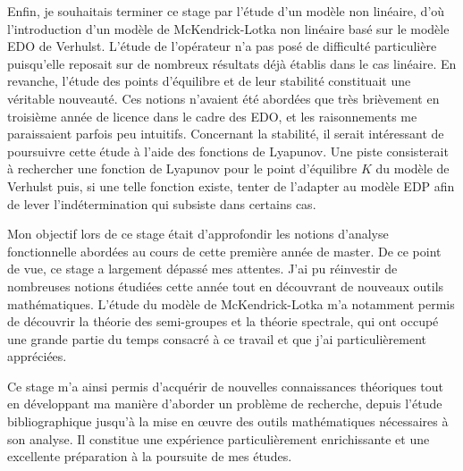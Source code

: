 Enfin, je souhaitais terminer ce stage par l'étude d'un modèle non linéaire, d'où l'introduction d'un modèle de McKendrick-Lotka non linéaire basé sur le modèle EDO de Verhulst. L'étude de l'opérateur n'a pas posé de difficulté particulière puisqu'elle reposait sur de nombreux résultats déjà établis dans le cas linéaire. En revanche, l'étude des points d'équilibre et de leur stabilité constituait une véritable nouveauté. Ces notions n'avaient été abordées que très brièvement en troisième année de licence dans le cadre des EDO, et les raisonnements me paraissaient parfois peu intuitifs. Concernant la stabilité, il serait intéressant de poursuivre cette étude à l'aide des fonctions de Lyapunov. Une piste consisterait à rechercher une fonction de Lyapunov pour le point d'équilibre $K$ du modèle de Verhulst puis, si une telle fonction existe, tenter de l'adapter au modèle EDP afin de lever l'indétermination qui subsiste dans certains cas.

Mon objectif lors de ce stage était d'approfondir les notions d'analyse fonctionnelle abordées au cours de cette première année de master. De ce point de vue, ce stage a largement dépassé mes attentes. J'ai pu réinvestir de nombreuses notions étudiées cette année tout en découvrant de nouveaux outils mathématiques. L'étude du modèle de McKendrick-Lotka m'a notamment permis de découvrir la théorie des semi-groupes et la théorie spectrale, qui ont occupé une grande partie du temps consacré à ce travail et que j'ai particulièrement appréciées.

Ce stage m'a ainsi permis d'acquérir de nouvelles connaissances théoriques tout en développant ma manière d'aborder un problème de recherche, depuis l'étude bibliographique jusqu'à la mise en œuvre des outils mathématiques nécessaires à son analyse. Il constitue une expérience particulièrement enrichissante et une excellente préparation à la poursuite de mes études.
